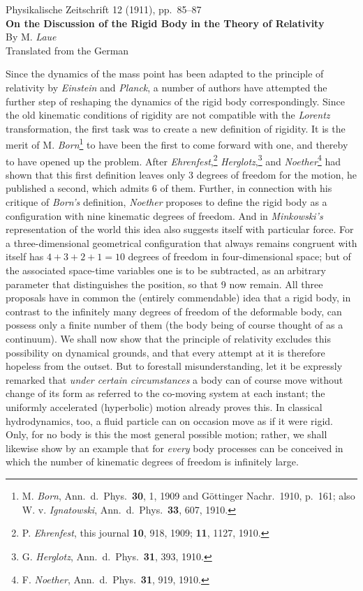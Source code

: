\documentclass[12pt,a4paper]{article}
\newcommand{\opage}[1]{\marginnote{\footnotesize\textit{[#1]}}}
\begin{document}
\thispagestyle{plain}
\begin{center}
{\small Physikalische Zeitschrift 12 (1911), pp.~85--87}\\[1.5em]
{\Large\bfseries On the Discussion of the Rigid Body in the Theory of Relativity}\\[1em]
{\large By M. \emph{Laue}}\\[1em]
{\small Translated from the German}
\end{center}
\bigskip

\opage{85}
Since the dynamics of the mass point has been adapted to the principle of relativity by \emph{Einstein} and \emph{Planck}, a number of authors have attempted the further step of reshaping the dynamics of the rigid body correspondingly.
Since the old kinematic conditions of rigidity are not compatible with the \emph{Lorentz} transformation, the first task was to create a new definition of rigidity.
It is the merit of M. \emph{Born}\footnote[1]{M. \emph{Born}, Ann.\ d.\ Phys.\ \textbf{30}, 1, 1909 and Göttinger Nachr.\ 1910, p.~161; also W. v. \emph{Ignatowski}, Ann.\ d.\ Phys.\ \textbf{33}, 607, 1910.} to have been the first to come forward with one, and thereby to have opened up the problem.
After \emph{Ehrenfest},\footnote[2]{P. \emph{Ehrenfest}, this journal \textbf{10}, 918, 1909; \textbf{11}, 1127, 1910.} \emph{Herglotz},\footnote[3]{G. \emph{Herglotz}, Ann.\ d.\ Phys.\ \textbf{31}, 393, 1910.} and \emph{Noether}\footnote[4]{F. \emph{Noether}, Ann.\ d.\ Phys.\ \textbf{31}, 919, 1910.} had shown that this first definition leaves only 3 degrees of freedom for the motion, he published a second, which admits 6 of them.
Further, in connection with his critique of \emph{Born's} definition, \emph{Noether} proposes to define the rigid body as a configuration with nine kinematic degrees of freedom.
And in \emph{Minkowski's} representation of the world this idea also suggests itself with particular force.
For a three-dimensional geometrical configuration that always remains congruent with itself has $4 + 3 + 2 + 1 = 10$ degrees of freedom in four-dimensional space; but of the associated space-time variables one is to be subtracted, as an arbitrary parameter that distinguishes the position, so that 9 now remain.
All three proposals have in common the (entirely commendable) idea that a rigid body, in contrast to the infinitely many degrees of freedom of the deformable body, can possess only a finite number of them (the body being of course thought of as a continuum).
We shall now show that the principle of relativity excludes this possibility on dynamical grounds, and that every attempt at it is therefore hopeless from the outset.
But to forestall misunderstanding, let it be expressly remarked that \emph{under certain circumstances} a body can of course move without change of its form as referred to the co-moving system at each instant; the uniformly accelerated (hyperbolic) motion already proves this.
In classical hydrodynamics, too, a fluid particle can on occasion move as if it were rigid.
Only, for
\opage{86}
no body is this the most general possible motion; rather, we shall likewise show by an example that for \emph{every} body processes can be conceived in which the number of kinematic degrees of freedom is infinitely large.
\end{document}
